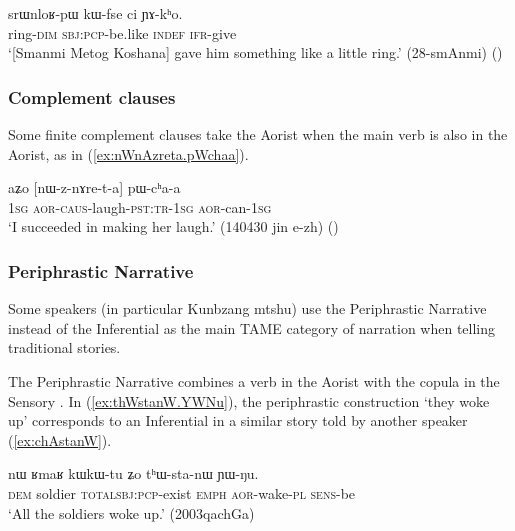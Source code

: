 \begin{exe}
\ex \label{ex:kWfse.ci.YAkho}
\gll srɯnloʁ-pɯ kɯ-fse ci ɲɤ-kʰo. \\
 ring-\textsc{dim} \textsc{sbj}:\textsc{pcp}-be.like \textsc{indef} \textsc{ifr}-give \\
 \glt `[Smanmi Metog Koshana] gave him something like a little ring.' (28-smAnmi)  ()
\end{exe}

\subsubsection{Complement clauses }   \label{sec:aor.complement} 
Some finite complement clauses take the Aorist when the main verb is also in the Aorist, as in (\ref{ex:nWnAzreta.pWchaa}). 

 \begin{exe}
\ex \label{ex:nWnAzreta.pWchaa}
\gll aʑo [nɯ-z-nɤre-t-a] pɯ-cʰa-a \\
\textsc{1sg} \textsc{aor}-\textsc{caus}-laugh-\textsc{pst}:\textsc{tr}-\textsc{1sg} \textsc{aor}-can-\textsc{1sg} \\
\glt `I succeeded in making her laugh.' (140430 jin e-zh) ()
\end{exe}
 
\subsubsection{Periphrastic Narrative }   \label{sec:aor.narrative}
Some speakers (in particular Kunbzang mtshu) use the Periphrastic Narrative instead of the Inferential as the main TAME category of narration when telling traditional stories.

The Periphrastic Narrative combines a verb in the Aorist with the copula in the Sensory . In (\ref{ex:thWstanW.YWNu}), the periphrastic construction  `they woke up' corresponds to an Inferential  in a similar story told by another speaker (\ref{ex:chAstanW}).

\begin{exe}
\ex \label{ex:thWstanW.YWNu}
\gll  nɯ ʁmaʁ kɯ\redp{}kɯ-tu ʑo tʰɯ-sta-nɯ ɲɯ-ŋu. \\
\textsc{dem} soldier \textsc{total}\redp{}\textsc{sbj}:\textsc{pcp}-exist \textsc{emph} \textsc{aor}-wake-\textsc{pl} \textsc{sens}-be \\
\glt `All the soldiers woke up.' (2003qachGa)
\end{exe}


